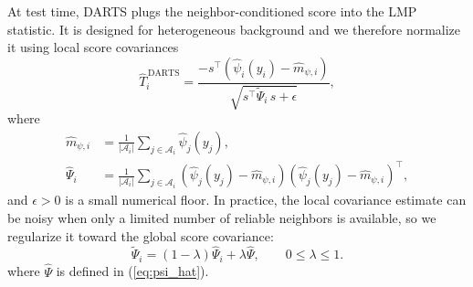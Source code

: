 At test time, DARTS plugs the neighbor-conditioned score into the LMP statistic. It is designed for heterogeneous background and we therefore normalize it using local score covariances
\begin{equation}
\widehat{T}_i^{\,\mathrm{DARTS}}
=\frac{-s^\top\!\left(\widehat{\psi}_i(y_i)-\widehat{m}_{\psi,i}\right)}
      {\sqrt{s^\top \widetilde{\Psi}_i\, s+\epsilon}},
\label{eq:local_normalized_rao_vector}
\end{equation}
where 
\begin{align}
\widehat{m}_{\psi,i}&=\frac{1}{|\mathcal{A}_i|}\sum_{j\in\mathcal{A}_i}
\widehat{\psi}_j(y_j),\nonumber\\
\widehat{\Psi}_i&=\frac{1}{|\mathcal{A}_i|}\sum_{j\in\mathcal{A}_i}
\left(\widehat{\psi}_j(y_j)-\widehat{m}_{\psi,i}\right)
\left(\widehat{\psi}_j(y_j)-\widehat{m}_{\psi,i}\right)^{\!\top},
\label{eq:local_score_covariance}
\end{align}
and $\epsilon>0$ is a small numerical floor. In practice, the local covariance
estimate can be noisy when only a limited number of reliable neighbors is
available, so we regularize it toward the global score covariance:
\begin{equation}
\widetilde{\Psi}_i
=
(1-\lambda)\widehat{\Psi}_i+\lambda\widehat{\Psi},
\qquad 0\leq\lambda\leq1.
\label{eq:shrunk_local_fisher}
\end{equation}
where $\hat{\Psi}$ is defined in (\ref{eq:psi_hat}).
